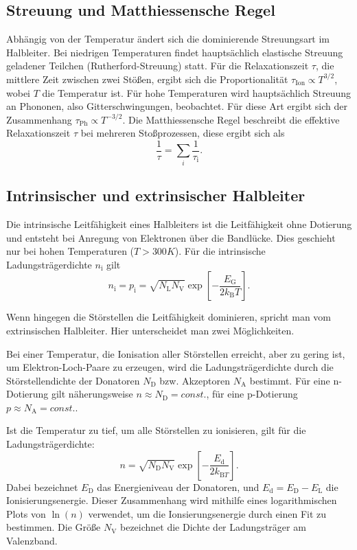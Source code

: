\subsection{Streuung und Matthiessensche Regel}
\label{sec:Streuung}
Abhängig von der Temperatur ändert sich die dominierende Streuungsart im Halbleiter. Bei niedrigen Temperaturen findet hauptsächlich elastische Streuung geladener Teilchen (Rutherford-Streuung) statt. Für die Relaxationszeit $\tau$, die mittlere Zeit zwischen zwei Stößen, ergibt sich die Proportionalität $\tau_{\mathrm{Ion}}\propto T^{3/2} $, wobei $T$ die Temperatur ist.
Für hohe Temperaturen wird hauptsächlich Streuung an Phononen, also Gitterschwingungen, beobachtet. Für diese Art ergibt sich der Zusammenhang $\tau_{\mathrm{Ph}}\propto T^{-3/2}$. \newline
Die Matthiessensche Regel beschreibt die effektive Relaxationszeit $\tau$ bei mehreren Stoßprozessen, diese ergibt sich als
\begin{equation}
    \frac{1}{\tau}=\sum_i \frac{1}{\tau_{\mathrm{i}}}.
\end{equation}
\subsection{Intrinsischer und extrinsischer Halbleiter}
Die intrinsische Leitfähigkeit eines Halbleiters ist die Leitfähigkeit ohne Dotierung und entsteht bei Anregung von Elektronen über die Bandlücke. Dies geschieht nur bei hohen Temperaturen ($T > 300 \unit{K}$). Für die intrinsische Ladungsträgerdichte $n_\mathrm{i}$ gilt
\begin{equation}
    n_{\mathrm{i}}=p_{\mathrm{i}}=
    \sqrt{N_{\mathrm{L}}N_{\mathrm{V}}}
    \exp{\left[-\frac{E_{\mathrm{G}}}{2k_{\mathrm{B}}T}\right]}.
\end{equation}

Wenn hingegen die Störstellen die Leitfähigkeit dominieren, spricht man vom extrinsischen Halbleiter. Hier unterscheidet man zwei Möglichkeiten.

Bei einer Temperatur, die Ionisation aller Störstellen erreicht, aber zu gering ist, um Elektron-Loch-Paare zu erzeugen, wird die Ladungsträgerdichte durch die Störstellendichte der Donatoren $N_{\mathrm{D}}$ bzw. Akzeptoren $N_{\mathrm{A}}$ bestimmt. Für eine n-Dotierung gilt näherungsweise $n \approx N_{\mathrm{D}}=const.$, für eine p-Dotierung $p \approx N_{\mathrm{A}}=const.$.

Ist die Temperatur zu tief, um alle Störstellen zu ionisieren, gilt für die Ladungsträgerdichte:
\begin{equation}
    n=\sqrt{N_{\mathrm{D}}N_{\mathrm{V}}}\exp{\left[-\frac{E_{\mathrm{d}}}{2k_{\mathrm{B}T}}\right]}.
\end{equation}\label{eq:Ed}
Dabei bezeichnet $E_{\mathrm{D}}$ das Energieniveau der Donatoren, und $E_{\mathrm{d}}=E_{\mathrm{D}}-E_{\mathrm{L}}$ die Ionisierungsenergie. Dieser Zusammenhang wird mithilfe eines logarithmischen Plots von $\ln(n)$ verwendet, um die Ionsierungsenergie durch einen Fit zu bestimmen. Die Größe $N_{\mathrm{V}}$ bezeichnet die Dichte der Ladungsträger am Valenzband.


